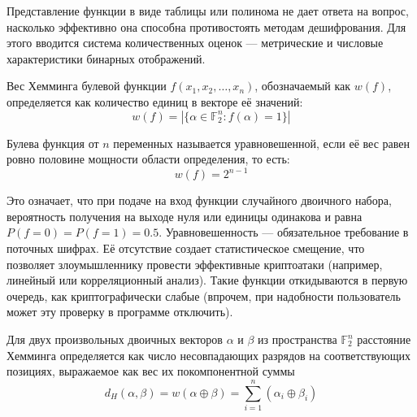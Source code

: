 \documentclass[14pt, a4paper]{extarticle}
\begin{document}
\vspace{2em}
\vspace{1em}

Представление функции в виде таблицы или полинома не дает ответа на вопрос,
насколько эффективно она способна противостоять методам дешифрования.
Для этого вводится система количественных оценок — метрические и числовые характеристики бинарных отображений.

\vspace{2em}
\vspace{1em}

Вес Хемминга булевой функции $f(x_1, x_2, \dots, x_n)$, обозначаемый как $w(f)$,
определяется как количество единиц в векторе её значений:
\begin{equation*}
w(f) = |\{\alpha \in \mathbb{F}_2^n : f(\alpha) = 1\}|
\end{equation*}

Булева функция от $n$ переменных называется уравновешенной, если её вес равен ровно половине мощности области определения, то есть:
\begin{equation*}
w(f) = 2^{n-1}
\end{equation*}

Это означает, что при подаче на вход функции случайного двоичного набора, вероятность получения на выходе нуля или единицы одинакова и равна $P(f=0) = P(f=1) = 0.5$.
Уравновешенность — обязательное требование в поточных шифрах.
Её отсутствие создает статистическое смещение,
что позволяет злоумышленнику провести эффективные криптоатаки (например, линейный или корреляционный анализ).
Такие функции откидываются в первую очередь, как криптографически слабые
(впрочем, при надобности пользователь может эту проверку в программе отключить).

Для двух произвольных двоичных векторов $\alpha$ и $\beta$
из пространства $\mathbb{F}_2^n$ расстояние Хемминга определяется как число несовпадающих разрядов на соответствующих позициях,
выражаемое как вес их покомпонентной суммы
\begin{equation*}
d_H(\alpha, \beta) = w(\alpha \oplus \beta) = \sum_{i=1}^{n} (\alpha_i \oplus \beta_i)
\end{equation*}
\end{document}

